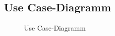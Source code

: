\subsection{Use Case-Diagramm}
\label{app:UseCase}
\begin{figure}[htb]
\centering
{}
\caption{Use Case-Diagramm}
\end{figure}